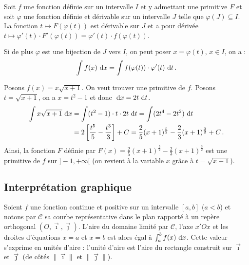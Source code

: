 	      \begin{thm}
	      Soit $f$ une fonction d\'efinie sur un intervalle $I$ et y admettant une primitive $F$ 
	      et soit $\varphi$ une fonction d\'efinie et d\'erivable sur un intervalle $J$ telle que $\varphi (J) \subseteq I$.
	      La fonction $t \mapsto F\left( \varphi (t) \right)$ est d\'erivable sur $J$ et a pour d\'eriv\'ee 
	      $t \mapsto \varphi'(t) \cdot F' \left( \varphi (t) \right)  = \varphi'(t) \cdot f\left(\varphi (t) \right) $.
	      
	      Si de plus $\varphi$ est une bijection de $J$ vers $I$, on peut poser $x=\varphi (t)$, $x\in I$, on a :
	            \begin{equation*}
	                  \int f(x) ~\mathrm{d}x = \int f(\varphi(t)) \cdot \varphi'(t) ~\mathrm{d}t      \,.
	            \label{eq:changement de variable primitive}
	            \end{equation*}
	            \begin{ex}
	                  Posons $f(x) = x \sqrt{x+1}$.
	                  On veut trouver une primitive de $f$.
	                  Posons $t = \sqrt{x+1}$, on a $x = t^2 - 1$ et donc $~\mathrm{d}x = 2t ~\mathrm{d}t$.
	                  \begin{align*}
	                        \int x \sqrt{x+1} ~\mathrm{d}x & = \int (t^2 - 1) \cdot t \cdot 2t ~\mathrm{d}t                                     
	                                                = \int (2t^4 - 2t^2) ~\mathrm{d}t                                                  \\
	                                              & = 2 \left[ \frac{t^5}{5} - \frac{t^3}{3} \right] + C                      
	                                                = \frac{2}{5} (x+1)^{\frac{5}{2}} - \frac{2}{3} (x+1)^{\frac{3}{2}} + C   \,.
	                  \end{align*}
	                  Ainsi, la fonction $F$ d\'efinie par 
	                  $F(x) = \frac{2}{5} (x+1)^{\frac{5}{2}} - \frac{2}{3} (x+1)^{\frac{3}{2}}$
	                  est une primitive de $f$ sur $]-1,+\infty[$ (on revient \`a la variable $x$ gr\^ace \`a $t = \sqrt{x+1}$).
	            \end{ex}
	      \end{thm}
      \subsection{Interpr\'etation graphique}
      Soient $f$ une fonction continue et positive sur un intervalle $[a,b]$ ($a<b$)
      et notons par $\mathscr{C}$ sa courbe repr\'esentative dans 
      le plan rapport\'e \`a un rep\`ere orthogonal $(O,\vec{\imath},\vec{\jmath})$.
      L'aire du domaine limit\'e par $\mathscr{C}$, l'axe $x'Ox$ et les droites d'\'equations $x=a$ et $x=b$
      est alors \'egal \`a {$\int_{a}^{b} f(x) ~\mathrm{d}x$}.
      Cette valeur s'exprime en unit\'es d'aire : l'unit\'e d'aire est l'aire du rectangle construit sur $\vec{\imath}$ et $\vec{\jmath}$ (de c\^ot\'es $\|\vec{\imath}\|$ et $\|\vec{\jmath}\|$).

